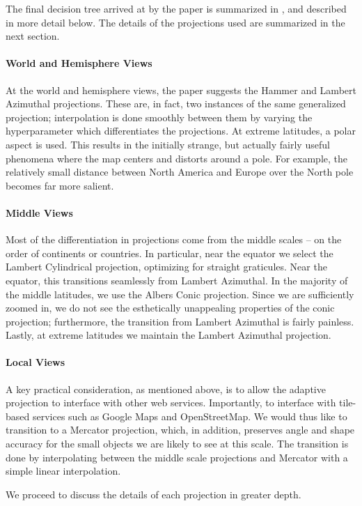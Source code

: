 The final decision tree arrived at by the paper is summarized in
  , and described in more detail below.
The details of the projections used are summarized in the next section.

\paragraph{World and Hemisphere Views}
At the world and hemisphere views, the paper suggests the Hammer and Lambert
  Azimuthal projections.
These are, in fact, two instances of the same generalized projection;
  interpolation is done smoothly between them by varying the hyperparameter
  which differentiates the projections.
At extreme latitudes, a polar aspect is used.
This results in the initially strange, but actually fairly useful phenomena
  where the map centers and distorts around a pole.
For example, the relatively small distance between North America and Europe
  over the North pole becomes far more salient.

\paragraph{Middle Views}
Most of the differentiation in projections come from the middle scales -- on the
  order of continents or countries.
In particular, near the equator we select the Lambert Cylindrical projection,
  optimizing for straight graticules.
Near the equator, this transitions seamlessly from Lambert Azimuthal.
In the majority of the middle latitudes, we use the Albers Conic projection.
Since we are sufficiently zoomed in, we do not see the esthetically unappealing
  properties of the conic projection; furthermore, the transition from
  Lambert Azimuthal is fairly painless.
Lastly, at extreme latitudes we maintain the Lambert Azimuthal projection.

\paragraph{Local Views}
A key practical consideration, as mentioned above, is to allow the adaptive
  projection to interface with other web services.
Importantly, to interface with tile-based services such as Google Maps and
  OpenStreetMap.
We would thus like to transition to a Mercator projection, which, in addition,
  preserves angle and shape accuracy for the small objects we are likely to
  see at this scale.
The transition is done by interpolating between the middle scale projections
  and Mercator with a simple linear interpolation.

We proceed to discuss the details of each projection in greater depth.
